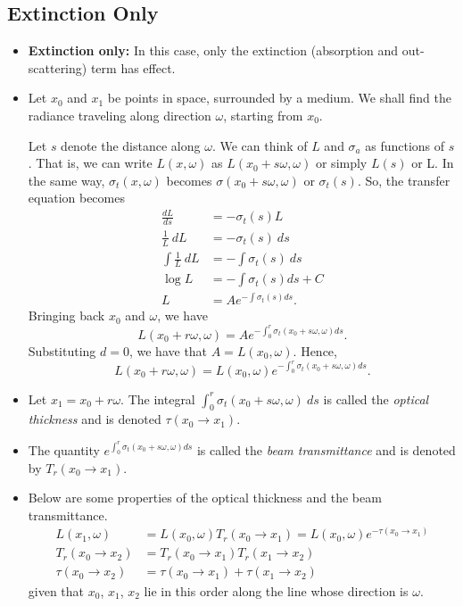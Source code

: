 \documentclass[10pt]{article}
\begin{document}
	\subsection{Extinction Only} %
	\label{sub:extinction_only}
	
		\begin{itemize}
			\item {\bf Extinction only:} In this case, only the extinction (absorption and out-scattering) term has effect.
			
			\item Let $x_0$ and $x_1$ be points in space, surrounded by a medium. We shall find the radiance traveling along
				direction $\omega$, starting from $x_0$.
				
				Let $s$ denote the distance along $\omega$. We can think of $L$ and $\sigma_a$ as functions
				of $s$. That is, we can write $L(x,\omega)$ as $L(x_0 + s\omega, \omega)$ or simply
				$L(s)$ or L. In the same way, $\sigma_t(x, \omega)$ becomes $\sigma(x_0 + s\omega, \omega)$
				or $\sigma_t(s)$. So, the transfer equation becomes
				\begin{align*}
					\frac{dL}{ds} &= -\sigma_t(s) L \\
					\frac{1}{L}\ dL &= -\sigma_t(s)\ ds \\
					\int \frac{1}{L}\ dL &= -\int \sigma_t(s)\ ds \\
					\log L &= -\int \sigma_t(s) ds + C \\
					L &= A e^{-\int \sigma_t(s) ds}.
				\end{align*}
				Bringing back $x_0$ and $\omega$, we have
				$$L(x_0 + r \omega, \omega) = A e^{-\int_0^{r} \sigma_t(x_0 + s\omega, \omega) ds}.$$
				Substituting $d = 0$, we have that $A = L(x_0, \omega).$
				Hence, $$L(x_0 + r\omega, \omega) = L(x_0, \omega) e^{-\int_0^{r} \sigma_t(x_0 + s\omega, \omega) ds}.$$
			
			\item Let $x_1 = x_0 + r\omega$. The integral $\int_0^{r}\sigma_t(x_0 + s\omega, \omega)\ ds$ is called
				the \emph{optical thickness} and is denoted $\tau(x_0 \rightarrow x_1).$
				
			\item The quantity $e^{\int_0^r\sigma_t(x_0 + s\omega, \omega) ds}$ is called the \emph{beam transmittance}
				and is denoted by $T_r(x_0 \rightarrow x_1).$
				
			\item Below are some properties of the optical thickness and the beam transmittance.
			\begin{align*}
				L(x_1, \omega) &= L(x_0, \omega) T_r(x_0 \rightarrow x_1) = L(x_0,\omega) e^{-\tau(x_0 \rightarrow x_1)}\\
				T_r(x_0 \rightarrow x_2) &= T_r(x_0 \rightarrow x_1) T_r(x_1 \rightarrow x_2) \\  
				\tau(x_0 \rightarrow x_2) &= \tau(x_0 \rightarrow x_1) + \tau(x_1 \rightarrow x_2)
			\end{align*}
			given that $x_0$, $x_1$, $x_2$ lie in this order along the line whose direction is $\omega$.
			

\end{itemize}
\end{document}
